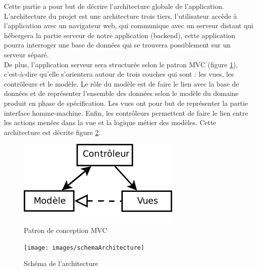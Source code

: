 Cette partie a pour but de décrire l'architecture globale de l'application.\\

L'architecture du projet est une architecture trois tiers, l'utilisateur accède à l'application avec un navigateur web, qui communique avec un serveur distant qui hébergera la partie serveur de notre application (backend), cette application pourra interroger une base de données qui se trouvera possiblement sur un serveur séparé.\\

De plus, l'application serveur sera structurée selon le patron MVC (figure \ref{MVC}), c'est-à-dire qu'elle s'orientera autour de trois couches qui sont : les vues, les contrôleurs et le modèle. Le rôle du modèle est de faire le lien avec la base de données et de représenter l'ensemble des données selon le modèle du domaine produit en phase de spécification. Les vues ont pour but de représenter la partie interface homme-machine. Enfin, les contrôleurs permettent de faire le lien entre les actions menées dans la vue et la logique métier des modèles. Cette architecture est décrite figure \ref{archi_schema}. \\


\begin{figure}[!h]
	\begin{center}
	\includegraphics[scale=0.5]{images/MVC}
	\caption{\label{MVC} Patron de conception MVC}
	\end{center}
\end{figure}

\begin{figure}[!h]
	\begin{center}
	\texttt{[image: images/schemaArchitecture]}
	\caption{\label{archi_schema} Schéma de l'architecture}
	\end{center}
\end{figure}